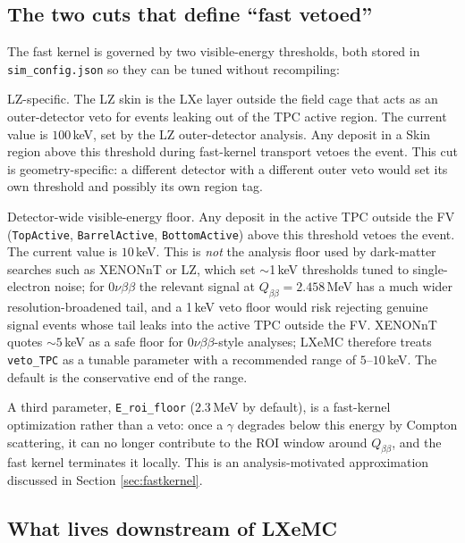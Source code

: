 \documentclass[11pt]{article}
\begin{document}
\subsection{The two cuts that define ``fast vetoed''}
\label{sec:two-cuts}

The fast kernel is governed by two visible-energy thresholds, both stored in
\texttt{sim\_config.json} so they can be tuned without recompiling:

\begin{description}[leftmargin=2.5cm,style=nextline]
\item[\texttt{veto\_skin}] LZ-specific. The LZ skin is the LXe layer outside
the field cage that acts as an outer-detector veto for events leaking out of
the TPC active region. The current value is $100$\,keV, set by the LZ outer-detector
analysis. Any deposit in a Skin region above this threshold during fast-kernel
transport vetoes the event. This cut is geometry-specific: a different
detector with a different outer veto would set its own threshold and possibly
its own region tag.

\item[\texttt{veto\_TPC}] Detector-wide visible-energy floor. Any deposit in
the active TPC outside the FV (\texttt{TopActive}, \texttt{BarrelActive},
\texttt{BottomActive}) above this threshold vetoes the event. The current
value is $10$\,keV. This is \emph{not} the analysis floor used by dark-matter
searches such as XENONnT or LZ, which set $\sim$1\,keV thresholds tuned to
single-electron noise; for $0\nu\beta\beta$ the relevant signal at $Q_{\beta\beta}
= 2.458$\,MeV has a much wider resolution-broadened tail, and a 1\,keV veto
floor would risk rejecting genuine signal events whose tail leaks into the
active TPC outside the FV. XENONnT quotes $\sim 5$\,keV as a safe floor for
$0\nu\beta\beta$-style analyses; LXeMC therefore treats \texttt{veto\_TPC} as a
tunable parameter with a recommended range of $5$--$10$\,keV. The default is
the conservative end of the range.
\end{description}

A third parameter, \texttt{E\_roi\_floor} ($2.3$\,MeV by default), is a
fast-kernel optimization rather than a veto: once a $\gamma$ degrades below
this energy by Compton scattering, it can no longer contribute to the ROI
window around $Q_{\beta\beta}$, and the fast kernel terminates it locally.
This is an analysis-motivated approximation discussed in Section
\ref{sec:fastkernel}.

\subsection{What lives downstream of LXeMC}
\label{sec:downstream}
\end{document}
